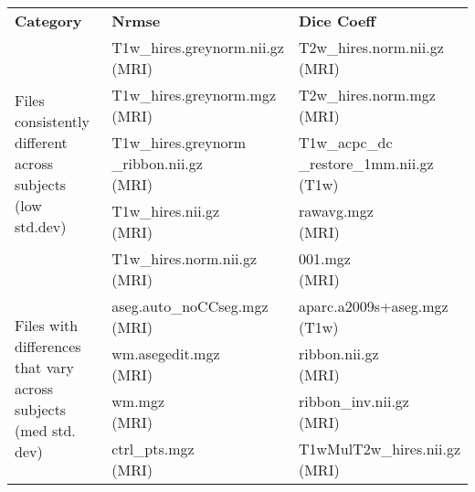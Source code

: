 \begin{center}
\begin{longtable}{|p{}|p{}|p{}|}
\cline{1-3}
\textbf{Category} & \textbf{Nrmse} & \textbf{Dice Coeff} \\\cline{1-3}
\multirow{5}{.3\textwidth}{Files consistently different across subjects (low std.dev)}     & \makecell[l]{T1w\_hires.greynorm.nii.gz \\ (MRI)}  & \makecell[l]{T2w\_hires.norm.nii.gz\\ (MRI)} \\\cline{2-3}
& \makecell[l]{T1w\_hires.greynorm.mgz\\(MRI)}                   & \makecell[l]{T2w\_hires.norm.mgz\\(MRI)} \\\cline{2-3}
& \makecell[l]{T1w\_hires.greynorm\\\_ribbon.nii.gz\\(MRI)}                        & \makecell[l]{T1w\_acpc\_dc\\\_restore\_1mm.nii.gz\\(T1w)} \\\cline{2-3}
& \makecell[l]{T1w\_hires.nii.gz\\(MRI)}              & \makecell[l]{rawavg.mgz\\(MRI)} \\\cline{2-3}
& \makecell[l]{T1w\_hires.norm.nii.gz\\(MRI)}                                        & \makecell[l]{001.mgz\\(MRI)} \\\cline{1-3}
\multirow{5}{.3\textwidth}{Files with differences that vary across subjects (med std. dev)} & \makecell[l]{aseg.auto\_noCCseg.mgz\\(MRI)}  & \makecell[l]{aparc.a2009s+aseg.mgz\\(T1w)} \\\cline{2-3}
& \makecell[l]{wm.asegedit.mgz\\(MRI)}                       & \makecell[l]{ribbon.nii.gz\\(MRI)} \\\cline{2-3}
& \makecell[l]{wm.mgz\\(MRI)}                           & \makecell[l]{ribbon\_inv.nii.gz\\(MRI)} \\\cline{2-3}
& \makecell[l]{ctrl\_pts.mgz\\(MRI)}                      & \makecell[l]{T1wMulT2w\_hires.nii.gz\\(MRI)} \\\cline{2-3}

\end{longtable}
\end{center}
